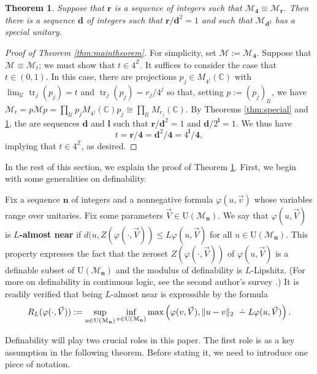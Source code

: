 \documentclass[12pt]{amsart}
\numberwithin{equation}{section}
\newtheorem{thm}{Theorem}[section]
\theoremstyle{definition}
\newcommand{\C}{\mathbb{C}}
\newcommand{\Z}{\mathbb{Z}}
\newcommand{\dminus}{ 
\buildrel\textstyle\ .\over{\hbox{ 
\vrule height3pt depth0pt width0pt}{\smash-} 
}}
\def\cal{\mathcal}
\def\M{\mathcal{M}}
\DeclareMathOperator{\tr}{tr}
\newcommand\cU{{\cal U}}
\def \u{\mathcal U}
\def \M{\mathcal{M}}
\begin{document}
\begin{thm}\label{thm:transfer}
Suppose that $\mathbf{r}$ is a sequence of integers such that $\M_\mathbf{4}\equiv \M_\mathbf{r}$.  Then there is a sequence $\mathbf{d}$ of integers such that $\mathbf{r}/\mathbf{d}^2=1$ and such that $\M_{\mathbf{d}^2}$ has a special unitary.  
\end{thm}

\begin{proof}[Proof of Theorem \ref{thm:maintheorem}]
For simplicity, set $\M:=\M_\mathbf{4}$.  Suppose that $\M\equiv \M_t$; we must show that $t\in 4^\Z$.  It suffices to consider the case that $t\in (0,1)$.  In this case, there are projections $p_j\in M_{4^j}(\C)$ with $\lim_\cU\tr_j(p_j)=t$ and $\tr_j(p_j)=r_j/4^j$ so that, setting $p:=(p_j)_\u$, we have $\M_t=p\M p=\prod_\cU p_jM_{4^j}(\C)p_j\cong \prod_\cU M_{r_j}(\C)$.  By Theorems \ref{thm:special} and \ref{thm:transfer}, the are sequences $\mathbf{d}$ and $\mathbf{l}$ such that $\mathbf{r}/\mathbf{d}^2=1$ and $\mathbf{d}/2^{\mathbf{l}}=1$.  We thus have
$$t=\mathbf{r}/\mathbf{4}=\mathbf{d}^2/\mathbf{4}=4^{\mathbf{l}}/\mathbf{4},$$ implying that $t\in 4^{\Z}$, as desired.  
\end{proof}

In the rest of this section, we explain the proof of Theorem \ref{thm:transfer}.  First, we begin with some generalities on definability.

Fix a sequence $\mathbf{n}$ of integers and a nonnegative formula $\varphi(u,\vec v)$ whose variables range over unitaries.  Fix some parameters $\vec V\in \mathrm{U}(\M_{\mathbf{n}})$. We say that $\varphi(u,\vec V)$ is \textbf{$L$-almost near} if $d(u,Z(\varphi(\cdot, \vec V))\leq L\varphi(u,\vec V)$ for all $u\in \mathrm{U}(\M_{\mathbf{n}})$.  This property expresses the fact that the zeroset $Z(\varphi(\cdot,\vec V))$ of $\varphi(u,\vec V)$ is a definable subset of $\mathrm{U}(\M_{\mathbf{n}})$ and the modulus of definability is $L$-Lipshitz.  (For more on definability in continuous logic, see the second author's survey \cite{goldbringspectralgap}.)  It is readily verified that being $L$-almost near is expressible by the formula
$$R_L(\varphi(\cdot,\vec V)):=\sup_{u\in \mathrm{U}(\M_{\mathbf{n}})}\inf_{v\in \mathrm{U}({\M_\mathbf{n}})}\max\left(\varphi(v,\vec V),\|u-v\|_2\dminus L\varphi(u,\vec V)\right).$$

Definability will play two crucial roles in this paper.  The first role is as a key assumption in the following theorem.  Before stating it, we need to introduce one piece of notation.
\end{document}
